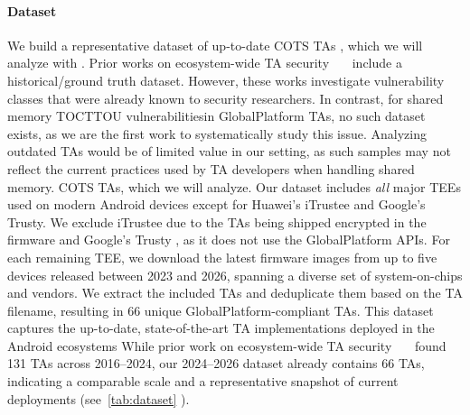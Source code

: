 \documentclass[conference]{IEEEtran} %
\newcommand{\sysname}{ScHMuzz\xspace}
\newcommand{\numTAs}{66\xspace}
\providecommand{\DIFaddtex}[1]{{\protect\color{blue} \sf #1}} %
\providecommand{\DIFdeltex}[1]{{\protect\color{red} \scriptsize #1}} %
\providecommand{\DIFaddbegin}{} %
\providecommand{\DIFaddend}{} %
\providecommand{\DIFdelbegin}{} %
\providecommand{\DIFdelend}{} %
\providecommand{\DIFadd}[1]{\texorpdfstring{\DIFaddtex{#1}}{#1}} %
\providecommand{\DIFdel}[1]{\texorpdfstring{\DIFdeltex{#1}}{}} %
\begin{document}
\paragraph{\DIFadd{Dataset}}
\DIFadd{We build a representative dataset of }\DIFaddend up-to-date \DIFdelbegin \DIFdel{COTS TAs , which we will analyze with }%
\DIFdel{. Prior works on ecosystem-wide TA security~\mbox{%
\cite{rollback,globalconfusion} }\hskip0pt%
include a historical/ground 
truth dataset. 
However, these works investigate vulnerability classes that were already known to security researchers. 
In contrast, for shared memory TOCTTOU vulnerabilitiesin GlobalPlatform TAs, no such dataset exists, as we are the 
first work to systematically study this issue.
Analyzing outdated TAs would be of limited value in our setting, as such samples may not reflect the current practices used by 
TA developers when handling shared memory. 
}\DIFdelend \DIFaddbegin \DIFadd{COTS TAs, which we will analyze. 
}\DIFaddend Our dataset includes \emph{all} major TEEs used on modern Android devices except for 
Huawei's iTrustee and Google's Trusty. We exclude iTrustee due to the TAs being shipped 
encrypted in the firmware and Google's Trusty\DIFaddbegin \DIFadd{, }\DIFaddend as it does not use the GlobalPlatform APIs. 
For each remaining TEE, we download the latest firmware 
images from up to five devices released between \DIFdelbegin \DIFdel{2023 }\DIFdelend \DIFaddbegin \DIFadd{2024 }\DIFaddend and 2026, spanning a diverse set of 
system-on-chips and vendors. We extract the included TAs and deduplicate them based on 
the TA filename, resulting in \numTAs \DIFaddbegin \DIFadd{unique }\DIFaddend GlobalPlatform-compliant TAs. 
\DIFdelbegin \DIFdel{This dataset 
captures the up-to-date, state-of-the-art TA implementations 
deployed in the Android ecosystems}\DIFdelend \DIFaddbegin \DIFadd{While prior work on ecosystem-wide TA security~\mbox{%
\cite{globalconfusion} }\hskip0pt%
found 131 TAs across 2016–2024, our 2024–2026 dataset 
already contains }\numTAs{} \DIFadd{TAs, indicating a comparable scale and a representative snapshot of 
current deployments (see~}\autoref{tab:dataset}\DIFadd{)}\DIFaddend .
\end{document}
